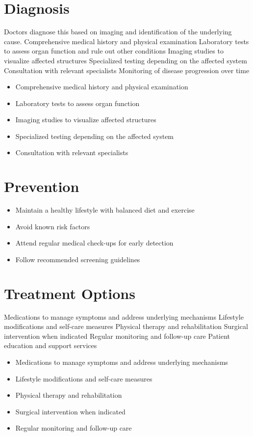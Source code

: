 \section{Diagnosis}
Doctors diagnose this based on imaging and identification of the underlying cause. Comprehensive medical history and physical examination Laboratory tests to assess organ function and rule out other conditions Imaging studies to visualize affected structures Specialized testing depending on the affected system Consultation with relevant specialists Monitoring of disease progression over time

\begin{itemize}[noitemsep]
  \item Comprehensive medical history and physical examination
  \item Laboratory tests to assess organ function
  \item Imaging studies to visualize affected structures
  \item Specialized testing depending on the affected system
  \item Consultation with relevant specialists
\end{itemize}
\section{Prevention}
\begin{itemize}[noitemsep]
  \item Maintain a healthy lifestyle with balanced diet and exercise
  \item Avoid known risk factors
  \item Attend regular medical check-ups for early detection
  \item Follow recommended screening guidelines
\end{itemize}
\section{Treatment Options}
Medications to manage symptoms and address underlying mechanisms Lifestyle modifications and self-care measures Physical therapy and rehabilitation Surgical intervention when indicated Regular monitoring and follow-up care Patient education and support services

\begin{itemize}[noitemsep]
  \item Medications to manage symptoms and address underlying mechanisms
  \item Lifestyle modifications and self-care measures
  \item Physical therapy and rehabilitation
  \item Surgical intervention when indicated
  \item Regular monitoring and follow-up care
\end{itemize}
